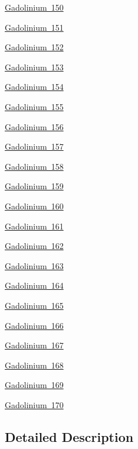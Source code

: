 \begin{DoxyCompactItemize}
\item 
\mbox{\hyperlink{group___isotope_const-_gadolinium-_gd150}{Gadolinium 150}}
\item 
\mbox{\hyperlink{group___isotope_const-_gadolinium-_gd151}{Gadolinium 151}}
\item 
\mbox{\hyperlink{group___isotope_const-_gadolinium-_gd152}{Gadolinium 152}}
\item 
\mbox{\hyperlink{group___isotope_const-_gadolinium-_gd153}{Gadolinium 153}}
\item 
\mbox{\hyperlink{group___isotope_const-_gadolinium-_gd154}{Gadolinium 154}}
\item 
\mbox{\hyperlink{group___isotope_const-_gadolinium-_gd155}{Gadolinium 155}}
\item 
\mbox{\hyperlink{group___isotope_const-_gadolinium-_gd156}{Gadolinium 156}}
\item 
\mbox{\hyperlink{group___isotope_const-_gadolinium-_gd157}{Gadolinium 157}}
\item 
\mbox{\hyperlink{group___isotope_const-_gadolinium-_gd158}{Gadolinium 158}}
\item 
\mbox{\hyperlink{group___isotope_const-_gadolinium-_gd159}{Gadolinium 159}}
\item 
\mbox{\hyperlink{group___isotope_const-_gadolinium-_gd160}{Gadolinium 160}}
\item 
\mbox{\hyperlink{group___isotope_const-_gadolinium-_gd161}{Gadolinium 161}}
\item 
\mbox{\hyperlink{group___isotope_const-_gadolinium-_gd162}{Gadolinium 162}}
\item 
\mbox{\hyperlink{group___isotope_const-_gadolinium-_gd163}{Gadolinium 163}}
\item 
\mbox{\hyperlink{group___isotope_const-_gadolinium-_gd164}{Gadolinium 164}}
\item 
\mbox{\hyperlink{group___isotope_const-_gadolinium-_gd165}{Gadolinium 165}}
\item 
\mbox{\hyperlink{group___isotope_const-_gadolinium-_gd166}{Gadolinium 166}}
\item 
\mbox{\hyperlink{group___isotope_const-_gadolinium-_gd167}{Gadolinium 167}}
\item 
\mbox{\hyperlink{group___isotope_const-_gadolinium-_gd168}{Gadolinium 168}}
\item 
\mbox{\hyperlink{group___isotope_const-_gadolinium-_gd169}{Gadolinium 169}}
\item 
\mbox{\hyperlink{group___isotope_const-_gadolinium-_gd170}{Gadolinium 170}}
\end{DoxyCompactItemize}


\subsection{Detailed Description}
